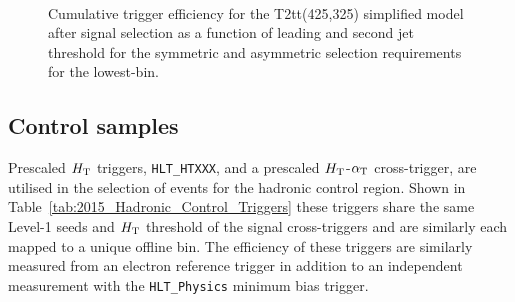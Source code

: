 \begin{figure}[h!]
  \begin{center}
     ~~
     \\
    \caption{
Cumulative trigger efficiency for the T2tt(425,325) simplified model after signal selection as a function of leading and second jet threshold for the symmetric and asymmetric selection requirements for the lowest-\scalht bin.}
    \label{fig:T1ttt_Trigger_Efficiency_DijetAve}
  \end{center} 
\end{figure}





\subsection{Control samples\label{sec:control_samples}}
Prescaled $\mbox{$H_\text{T}$}$ triggers, \verb!HLT_HTXXX!, and a prescaled 
$\mbox{$H_\text{T}$}$-$\alpha_{\text{T}}$ cross-trigger, are utilised in the 
selection of events for the hadronic control region. Shown 
in Table~\ref{tab:2015_Hadronic_Control_Triggers} these triggers share the same Level-1 
seeds and $\mbox{$H_\text{T}$}$ threshold of the signal cross-triggers and are similarly each mapped 
to a unique offline bin. The efficiency of these triggers are similarly measured from an electron 
reference trigger in addition to an independent measurement with the \verb!HLT_Physics! 
minimum bias trigger.


